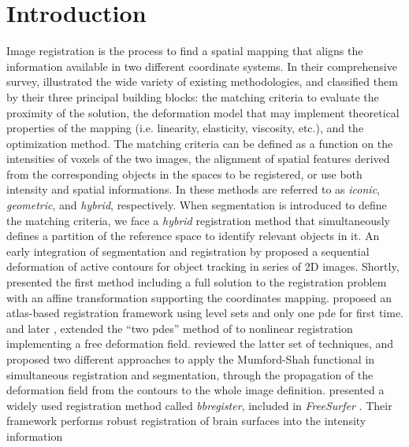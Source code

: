 \section{Introduction}%
\label{sec:introduction}
Image registration is the process to find a spatial mapping that aligns the information available
  in two different coordinate systems.
In their comprehensive survey, \cite{sotiras_deformable_2013} illustrated the wide variety
  of existing methodologies, and classified them by their three principal building blocks:
  the matching criteria to evaluate the proximity of the solution,
  the deformation model that may implement theoretical properties of the mapping
  (i.e. linearity, elasticity, viscosity, etc.), and the optimization method.
The matching criteria can be defined as a function on the intensities of voxels of the
  two images, the alignment of spatial features derived from the corresponding objects in
  the spaces to be registered, or use both intensity and spatial informations.
In \citep{sotiras_deformable_2013} these methods are referred to as \emph{iconic}, \emph{geometric},
  and \emph{hybrid}, respectively.
When segmentation is introduced to define the matching criteria, we face a \emph{hybrid}
  registration method that simultaneously defines a partition of the reference space to identify
  relevant objects in it.
An early integration of segmentation and registration by \cite{bertalmio_morphing_2000} proposed
  a sequential deformation of active contours for object tracking in series of 2D images.
Shortly, \cite{yezzi_variational_2003} presented the first method including a full solution to
  the registration problem with an affine transformation supporting the coordinates mapping.
\cite{vemuri_joint_2003} proposed an atlas-based registration framework using level sets and only
  one \gls*{pde} for first time.
\cite{unal_coupled_2005} and later \cite{wang_joint_2006},
  extended the ``two \glspl*{pde}'' method of \cite{yezzi_variational_2003}
  to nonlinear registration implementing a free deformation field.
\cite{droske_mumfordshah_2009} reviewed the latter set of techniques, and proposed two different
  approaches to apply the Mumford-Shah functional \citep{mumford_optimal_1989} in simultaneous
  registration and segmentation, through the propagation of the deformation field from
  the contours to the whole image definition.
\cite{greve_accurate_2009} presented a widely used registration method called \emph{bbregister},
  included in \emph{FreeSurfer} \citep{fischl_freesurfer_2012}.
Their framework performs robust registration of brain surfaces into the intensity information
